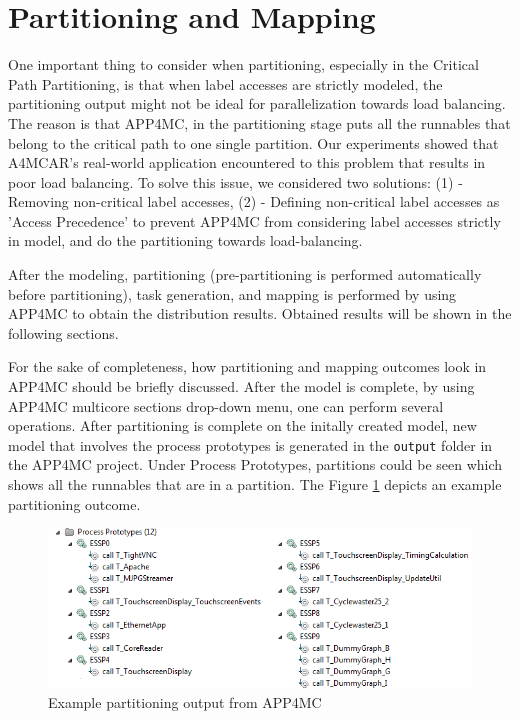 \section{Partitioning and Mapping}

One important thing to consider when partitioning, especially in the Critical Path Partitioning, is that when label accesses are strictly modeled, the partitioning output might not be ideal for parallelization towards load balancing. The reason is that APP4MC, in the partitioning stage puts all the runnables that belong to the critical path to one single partition. Our experiments showed that A4MCAR's real-world application encountered to this problem that results in poor load balancing. To solve this issue, we considered two solutions: (1) - Removing non-critical label accesses, (2) - Defining non-critical label accesses as 'Access Precedence' to prevent APP4MC from considering label accesses strictly in model, and do the partitioning towards load-balancing.

After the modeling, partitioning (pre-partitioning is performed automatically before partitioning), task generation, and mapping is performed by using APP4MC to obtain the distribution results. Obtained results will be shown in the following sections.

For the sake of completeness, how partitioning and mapping outcomes look in APP4MC should be briefly discussed. After the model is complete, by using APP4MC multicore sections drop-down menu, one can perform several operations. After partitioning is complete on the initally created model, new model that involves the process prototypes is generated in the \texttt{output} folder in the APP4MC project. Under Process Prototypes, partitions could be seen which shows all the runnables that are in a partition. The Figure \ref{fig:partitions} depicts an example partitioning outcome.

\begin{figure}[!ht]
	\centering
	\captionsetup{justification=centering}
	\includegraphics[width=\textwidth]{content/images/partitions.png}
	\caption{Example partitioning output from APP4MC}
	\label{fig:partitions}
\end{figure}

